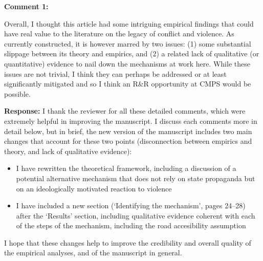 \documentclass[12pt, a4paper, notitlepage]{article}
\begin{document}
\vspace{15pt}
\noindent\textbf{Comment 1:}
\begin{displayquote}
Overall, I thought this article had some intriguing empirical findings that could have real value to the literature on the legacy of conflict and violence. As currently constructed, it is however marred by two issues: (1) some substantial slippage between its theory and empirics, and (2) a related lack of qualitative (or quantitative) evidence to nail down the mechanisms at work here. While these issues are not trivial, I think they can perhaps be addressed or at least significantly mitigated and so I think an R\&R opportunity at CMPS would be possible.
\end{displayquote}

\noindent\textbf{Response:} I thank the reviewer for all these detailed comments, which were extremely helpful in improving the manuscript. I discuss each comments more in detail below, but in brief, the new version of the manuscript includes two main changes that account for these two points (disconnection between empirics and theory, and lack of qualitative evidence):

\begin{itemize}
  \item I have rewritten the theoretical framework, including a discussion of a potential alternative mechanism that does not rely on state propaganda but on an ideologically motivated reaction to violence
  \item I have included a new section (`Identifying the mechanism', pages 24--28) after the `Results' section, including qualitative evidence coherent with each of the steps of the mechanism, including the road accesibility assumption
\end{itemize}

I hope that these changes help to improve the credibility and overall quality of the empirical analyses, and of the manuscript in general.
\end{document}
